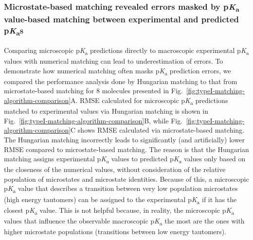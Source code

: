 \documentclass[9pt,lineno,final]{elife}
\newcommand{\pKa}{p\textit{K}\textsubscript{a}}
\begin{document}
\subsubsection{Microstate-based matching revealed errors masked by \pKa{} value-based matching between experimental and predicted \pKa{}s}

Comparing microscopic \pKa{} predictions directly to macroscopic experimental \pKa{} values with numerical matching can lead to underestimation of errors. 
To demonstrate how numerical matching often masks \pKa{} prediction errors, we compared the performance analysis done by Hungarian matching to that from microstate-based matching for 8 molecules presented in Fig.~\ref{fig:typeI-matching-algorithm-comparison}A. 
RMSE calculated for microscopic \pKa{} predictions matched to experimental values via Hungarian matching is shown in Fig.~\ref{fig:typeI-matching-algorithm-comparison}B, while Fig.~\ref{fig:typeI-matching-algorithm-comparison}C shows RMSE calculated via microstate-based matching. 
The Hungarian matching incorrectly leads to significantly (and artificially) lower RMSE compared to microstate-based matching. 
The reason is that the Hungarian matching assigns experimental \pKa{} values to predicted \pKa{} values only based on the closeness of the numerical values, without consideration of the relative population of microstates and microstate identities. 
Because of this, a microscopic \pKa{} value that describes a transition between very low population microstates (high energy tautomers) can be assigned to the experimental \pKa{} if it has the closest \pKa{} value. 
This is not helpful because, in reality, the microscopic \pKa{}~ values that influence the observable macroscopic \pKa{} the most are the ones with higher microstate populations (transitions between low energy tautomers).
\end{document}
